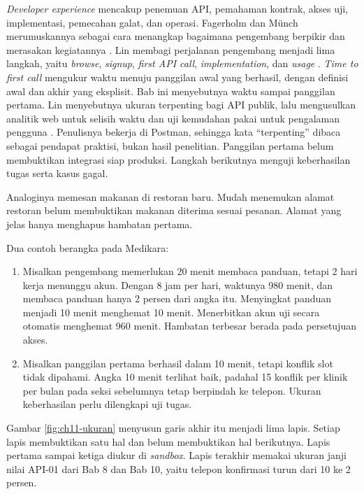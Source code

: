 \textit{Developer experience} mencakup penemuan API, pemahaman kontrak, akses uji, implementasi, pemecahan galat, dan
operasi. Fagerholm dan Münch merumuskannya sebagai cara menangkap bagaimana pengembang berpikir dan merasakan
kegiatannya \cite{c11-fagerholm2012}. Lin membagi perjalanan pengembang menjadi lima langkah, yaitu \textit{browse},
\textit{signup}, \textit{first API call}, \textit{implementation}, dan \textit{usage} \cite{c11-lin2021}. \textit{Time to
first call} mengukur waktu menuju panggilan awal yang berhasil, dengan definisi awal dan akhir yang eksplisit. Bab ini
menyebutnya waktu sampai panggilan pertama. Lin menyebutnya ukuran terpenting bagi API publik, lalu mengusulkan analitik
web untuk selisih waktu dan uji kemudahan pakai untuk pengalaman pengguna \cite{c11-lin2021}. Penulisnya bekerja di
Postman, sehingga kata ``terpenting'' dibaca sebagai pendapat praktisi, bukan hasil penelitian. Panggilan pertama belum
membuktikan integrasi siap produksi. Langkah berikutnya menguji keberhasilan tugas serta kasus gagal.

Analoginya memesan makanan di restoran baru. Mudah menemukan alamat restoran belum membuktikan makanan diterima sesuai
pesanan. Alamat yang jelas hanya menghapus hambatan pertama.

Dua contoh berangka pada Medikara:
\begin{enumerate}
  \item Misalkan pengembang memerlukan 20 menit membaca panduan, tetapi 2 hari kerja menunggu akun. Dengan 8 jam per
        hari, waktunya 980 menit, dan membaca panduan hanya 2 persen dari angka itu. Menyingkat panduan menjadi 10 menit
        menghemat 10 menit. Menerbitkan akun uji secara otomatis menghemat 960 menit. Hambatan terbesar berada pada
        persetujuan akses.
  \item Misalkan panggilan pertama berhasil dalam 10 menit, tetapi konflik slot tidak dipahami. Angka 10 menit terlihat
        baik, padahal 15 konflik per klinik per bulan pada seksi sebelumnya tetap berpindah ke telepon. Ukuran
        keberhasilan perlu dilengkapi uji tugas.
\end{enumerate}

Gambar \ref{fig:ch11-ukuran} menyusun garis akhir itu menjadi lima lapis. Setiap lapis membuktikan satu hal dan belum
membuktikan hal berikutnya. Lapis pertama sampai ketiga diukur di \textit{sandbox}. Lapis terakhir memakai ukuran janji
nilai API-01 dari Bab 8 dan Bab 10, yaitu telepon konfirmasi turun dari 10 ke 2 persen.

